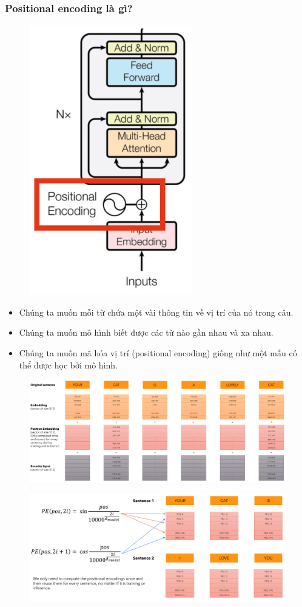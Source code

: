 \documentclass{book}
\begin{document}
            \subsubsection{Positional encoding là gì?}
            \begin{figure}[H]
                \centering
                \includegraphics[width=0.25\linewidth]{images/12d_5.png}
        
            \end{figure}
            \begin{itemize}
                \item Chúng ta muốn mỗi từ chứa một vài thông tin về vị trí của nó trong câu.
                \item Chúng ta muốn mô hình biết được các từ nào gần nhau và xa nhau.
                \item Chúng ta muốn mã hóa vị trí (positional encoding) giống như một mẫu có thể được học bởi mô hình.
            \end{itemize}
            \begin{figure}[H]
                \centering
                \includegraphics[width=1.0\linewidth]{images/12d_6.png}
        
            \end{figure}
            \begin{figure}[H]
                \centering
                \includegraphics[width=1.0\linewidth]{images/12d_7.png}
        
            \end{figure}
\end{document}
